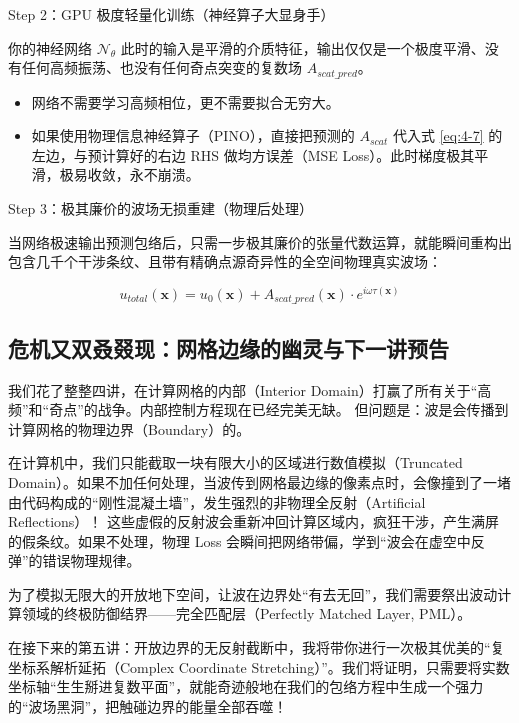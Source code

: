 \documentclass[12pt]{article}
\begin{document}
{Step 2：GPU 极度轻量化训练（神经算子大显身手）

你的神经网络 $\mathcal{N}_{\theta}$ 此时的输入是平滑的介质特征，输出仅仅是一个极度平滑、没有任何高频振荡、也没有任何奇点突变的复数场 $A_{scat\_pred}$。

\begin{itemize}[leftmargin=2em]
    \item 网络不需要学习高频相位，更不需要拟合无穷大。
    \item 如果使用物理信息神经算子（PINO），直接把预测的 $A_{scat}$ 代入式 \eqref{eq:4-7} 的左边，与预计算好的右边 RHS 做均方误差（MSE Loss）。此时梯度极其平滑，极易收敛，永不崩溃。
\end{itemize}

Step 3：极其廉价的波场无损重建（物理后处理）

当网络极速输出预测包络后，只需一步极其廉价的张量代数运算，就能瞬间重构出包含几千个干涉条纹、且带有精确点源奇异性的全空间物理真实波场：

\begin{equation}
u_{total}(\mathbf{x}) = u_0(\mathbf{x}) + A_{scat\_pred}(\mathbf{x}) \cdot e^{i \omega \tau(\mathbf{x})}
\label{eq:4-total-reconstruct}
\end{equation}

\subsection{危机又双叒叕现：网格边缘的幽灵与下一讲预告}

我们花了整整四讲，在计算网格的内部（Interior Domain）打赢了所有关于“高频”和“奇点”的战争。内部控制方程现在已经完美无缺。
但问题是：波是会传播到计算网格的物理边界（Boundary）的。

在计算机中，我们只能截取一块有限大小的区域进行数值模拟（Truncated Domain）。如果不加任何处理，当波传到网格最边缘的像素点时，会像撞到了一堵由代码构成的“刚性混凝土墙”，发生强烈的非物理全反射（Artificial Reflections）！
这些虚假的反射波会重新冲回计算区域内，疯狂干涉，产生满屏的假条纹。如果不处理，物理 Loss 会瞬间把网络带偏，学到“波会在虚空中反弹”的错误物理规律。

为了模拟无限大的开放地下空间，让波在边界处“有去无回”，我们需要祭出波动计算领域的终极防御结界——完全匹配层（Perfectly Matched Layer, PML）。

在接下来的第五讲：开放边界的无反射截断中，我将带你进行一次极其优美的“复坐标系解析延拓（Complex Coordinate Stretching）”。我们将证明，只需要将实数坐标轴“生生掰进复数平面”，就能奇迹般地在我们的包络方程中生成一个强力的“波场黑洞”，把触碰边界的能量全部吞噬！


}
\end{document}
